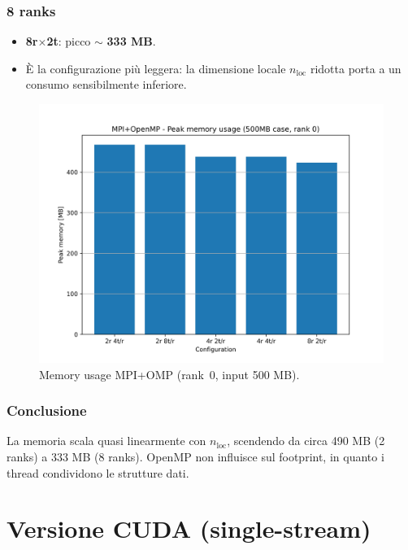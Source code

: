 			\subsubsection{8 ranks}
				\begin{itemize}
						\item \textbf{8r$\times$2t}: picco $\sim$ \textbf{333 MB}.
						\item È la configurazione più leggera: la dimensione locale $n_\text{loc}$ ridotta porta a un consumo sensibilmente inferiore.
				\end{itemize}
				
				\begin{figure}[H]
						\centering
						\includegraphics[width=1\linewidth]{img/mpi_omp_plots/mpi_omp_memory.jpg}
						\caption{Memory usage MPI+OMP (rank~0, input 500 MB).}
						\label{fig:mpi_omp_mem_usage}
				\end{figure}
			
			\subsubsection*{Conclusione}
				La memoria scala quasi linearmente con $n_\text{loc}$, scendendo da circa 490 MB (2 ranks) a 333 MB (8 ranks).
				OpenMP non influisce sul footprint, in quanto i thread condividono le strutture dati.
	
	\section{Versione CUDA (single-stream)}
		
